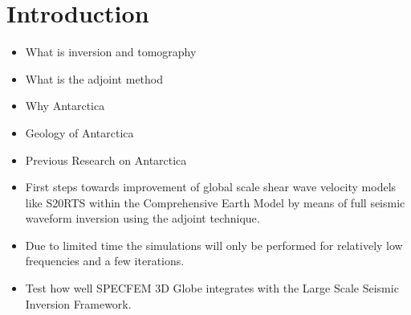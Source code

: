 \chapter{Introduction}



\begin{itemize}
\item What is inversion and tomography 
\item What is the adjoint method
\item Why Antarctica
\item Geology of Antarctica
\item Previous Research on Antarctica
\item First steps towards improvement of global scale shear wave velocity models like S20RTS within the Comprehensive Earth Model by means of full seismic waveform inversion using the adjoint technique. 
\item Due to limited time the simulations will only be performed for relatively low frequencies and a few iterations.
\item Test how well SPECFEM 3D Globe integrates with the Large Scale Seismic Inversion Framework.
\end{itemize}
